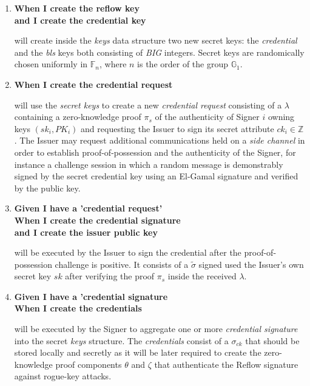 \documentclass[twocolumn]{article}
\begin{document}
\begin{enumerate}

\item \textbf{When I create the reflow key}
  \\ \textbf{and I create the credential key}

  will create inside the \emph{keys} data structure two new secret
  keys: the \emph{credential} and the \emph{bls} keys both consisting
  of \emph{BIG} integers. Secret keys are randomically chosen
  uniformly in $\mathbb{F}_n$, where $n$ is the order of the group
  $\mathbb{G}_1$.

\item \textbf{When I create the credential request}

  will use the \emph{secret keys} to create a new \emph{credential
    request} consisting of a $\lambda$ containing a zero-knowledge
  proof $\pi_s$ of the authenticity of Signer $i$ owning keys
  $(sk_i, PK_i)$ and requesting the Issuer to sign its secret
  attribute $ck_i\in\mathbb{Z}$. The Issuer may request additional
  communications held on a \emph{side channel} in order to establish
  proof-of-possession and the authenticity of the Signer, for instance
  a challenge session in which a random message is demonstrably signed
  by the secret credential key using an El-Gamal signature
  \citep{elgamal} and verified by the public key.

\item \textbf{Given I have a 'credential request'}
 \\ \textbf{When I create the credential signature}
 \\ \textbf{and I create the issuer public key}

  will be executed by the Issuer to sign the credential after the
  proof-of-possession challenge is positive. It consists of a
  $\tilde{\sigma}$ signed used the Issuer's own secret key $sk$ after
  verifying the proof $\pi_s$ inside the received $\lambda$.

\item \textbf{Given I have a 'credential signature}
 \\ \textbf{When I create the credentials}

 will be executed by the Signer to aggregate one or more
 \emph{credential signature} into the secret \emph{keys} structure.
 The \emph{credentials} consist of a $\sigma_{ck}$ that should be
 stored locally and secretly as it will be later required to create
 the zero-knowledge proof components $\theta$ and $\zeta$ that
 authenticate the Reflow signature against rogue-key attacks.
\end{enumerate}
\end{document}
